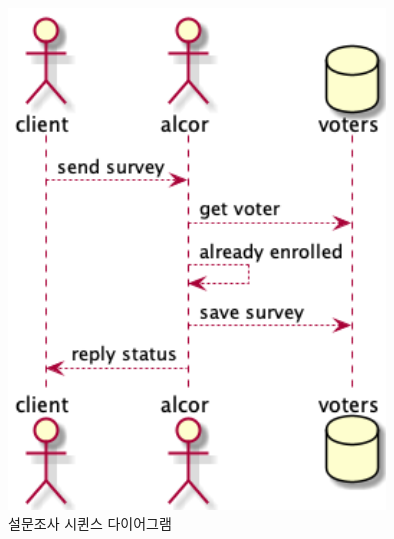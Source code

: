 \documentclass[8pt,a4paper,left=8mm,right=8mm,top=10mm,bottom=10mm]{article}
\begin{document}
    \begin{figure}[h]
        \begin{center}
            \includegraphics[width=10cm]{survey-seq}
            \caption{설문조사 시퀸스 다이어그램}
        \end{center}
    \end{figure}
\end{document}
